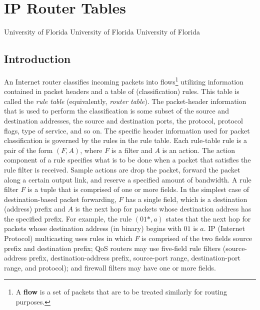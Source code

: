 \chapter{
IP Router Tables}

\begin{chapterauthors}
{University of Florida}
{University of Florida}
{University of Florida}
\end{chapterauthors}

\section{Introduction}\label{sec:introduction}
An Internet router classifies incoming packets into flows\footnote{A
{\bf flow} is a set of packets that are to be treated similarly for routing
purposes.}
utilizing information
contained in packet headers and a table of (classification) rules. This
table is called the {\em rule table} (equivalently, {\em router table}).
The packet-header information that is used to perform
the classification
is some subset of the source and destination addresses, the source and
destination ports, the protocol, protocol flags, type of service, and so on.
The specific header information used for packet classification
is governed by the rules in the rule table.
Each rule-table rule is a pair of the form $(F,A)$,
where $F$ is a filter and $A$ is an action.
The action component of a rule specifies what is to be done when a packet
that satisfies the rule filter is received.
Sample actions are drop the packet, forward the packet along a certain output
link, and reserve a specified amount of bandwidth.
A rule filter $F$ is a tuple that is comprised of one or more fields. 
In the simplest case of
destination-based packet forwarding, $F$ has a single field, which is a
destination (address) prefix and $A$ is the next hop for packets whose
destination address has the specified prefix. 
For example, the rule $(01*, a)$ states that the next hop for packets whose
destination address (in binary) begins with $01$ is $a$.
IP (Internet Protocol) multicasting uses rules in which $F$
is comprised of the two fields source prefix and destination prefix;
QoS routers may use five-field rule filters (source-address prefix,
destination-address prefix, source-port range, destination-port range,
and protocol); and firewall filters may have one or more fields.

